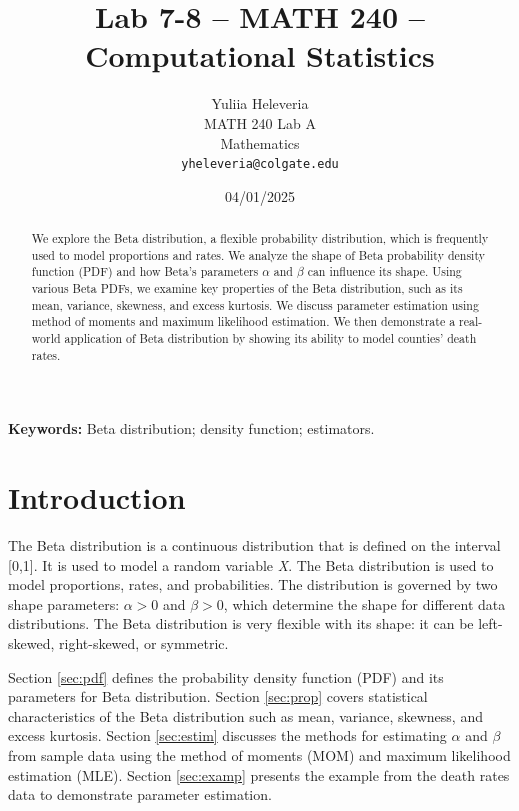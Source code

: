 \documentclass{article}\usepackage[]{graphicx}\usepackage[]{xcolor}
\begin{document}
\vspace{-1in}
\title{Lab 7-8 -- MATH 240 -- Computational Statistics}

\author{
  Yuliia Heleveria \\
  MATH 240 Lab A  \\
  Mathematics  \\
  {\tt yheleveria@colgate.edu}
}

\date{04/01/2025}

\maketitle

\begin{multicols}{2}
 \raggedcolumns
\begin{abstract}
We explore the Beta distribution, a flexible probability distribution, which is frequently used to model proportions and rates. We analyze the shape of Beta probability density function (PDF) and how Beta's parameters $\alpha$ and $\beta$ can influence its shape. Using various Beta PDFs, we examine key properties of the Beta distribution, such as its mean, variance, skewness, and excess kurtosis. We discuss parameter estimation using method of moments and maximum likelihood estimation. We then demonstrate a real-world application of Beta distribution by showing its ability to model counties' death rates.
\end{abstract}

\noindent \textbf{Keywords:} Beta distribution; density function; estimators.

\section{Introduction}
The Beta distribution is a continuous distribution that is defined on the interval [0,1]. It is used to model a random variable \textit{X}. The Beta distribution is used to model proportions, rates, and probabilities. The distribution is governed by two shape parameters: $\alpha > 0$ and $\beta > 0$, which determine the shape for different data distributions. The Beta distribution is very flexible with its shape: it can be left-skewed, right-skewed, or symmetric. 


Section \ref{sec:pdf} defines the probability density function (PDF) and its parameters for Beta distribution. Section \ref{sec:prop} covers statistical characteristics of the Beta distribution such as mean, variance, skewness, and excess kurtosis. Section \ref{sec:estim} discusses the methods for estimating $\alpha$ and $\beta$ from sample data using the method of moments (MOM) and maximum likelihood estimation (MLE). Section \ref{sec:examp} presents the example from the death rates data to demonstrate parameter estimation.




\end{multicols}
\end{document}
